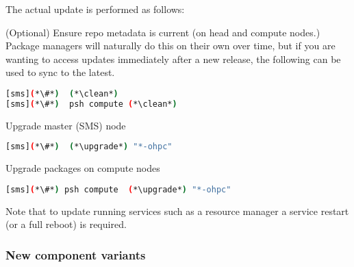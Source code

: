 The actual update is performed as follows:
\begin{enumerate*}
\item (Optional) Ensure repo metadata is current (on head and compute nodes.)
  Package managers will naturally do this on their own over time,
  but if you are wanting to access updates immediately after a new release,
  the following can be used to sync to the latest.

\begin{lstlisting}[language=bash,keywords={}]
[sms](*\#*)  (*\clean*)
[sms](*\#*)  psh compute (*\clean*)
\end{lstlisting}

\item Upgrade master (SMS) node

\begin{lstlisting}[language=bash,keywords={}]
[sms](*\#*)  (*\upgrade*) "*-ohpc"
\end{lstlisting}
  
\item Upgrade packages on compute nodes

\begin{lstlisting}[language=bash,keywords={}]
[sms](*\#*) psh compute  (*\upgrade*) "*-ohpc"
\end{lstlisting}
  

\end{enumerate*}

\noindent Note that to update running services such as a resource manager a
service restart (or a full reboot) is required.

\subsubsection{New component variants}

